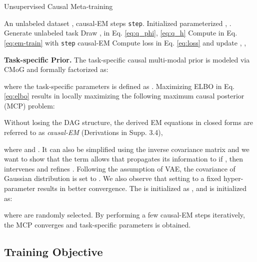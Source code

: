 \documentclass[letterpaper]{article} \usepackage{aaai23}  \usepackage{times}  \usepackage{helvet}  \usepackage{courier}  \usepackage[hyphens]{url}  \usepackage{graphicx} \urlstyle{rm} \def\UrlFont{\rm}  \usepackage{natbib}  \usepackage{caption} \frenchspacing  \setlength{\pdfpagewidth}{8.5in}  \setlength{\pdfpageheight}{11in}  \usepackage{algorithm}
\theoremstyle{plain}
\theoremstyle{definition}
\theoremstyle{remark}
\begin{document}
\begin{algorithm}[t]
	\small
	\caption{Unsupervised Causal Meta-training}
	\label{alg:meta-training}
	\begin{algorithmic}
		 An unlabeled dataset , causal-EM steps \texttt{step}.
		\STATE Initialized parameterized , .
		\STATE Generate unlabeled task 
		\STATE Draw ,  in Eq. \ref{eq:q_phi}, \ref{eq:q_h}
		\STATE Compute  in Eq. \ref{eq:em-train} with \texttt{step} causal-EM 
		\STATE Compute loss  in Eq. \ref{eq:loss} and update , , 				
		\ENDWHILE
	\end{algorithmic}
\end{algorithm}







\noindent\textbf{Task-specific Prior.} 
The task-specific causal multi-modal prior is modeled via CMoG and formally factorized as:
 		
where the task-specific parameters  is defined as . Maximizing ELBO in Eq. \ref{eq:elbo} results in locally maximizing the following maximum causal posterior (MCP) problem:
	
Without losing the DAG structure, the derived EM equations in closed forms are referred to as \textit{causal-EM} (Derivations in Supp. 3.4),

where  and . It can also be simplified using the inverse covariance matrix and we want to show that the term  allows that  propagates its information to  if , then intervenes and refines .  Following the assumption of VAE, the covariance of Gaussian distribution is set to . We also observe that setting  to a fixed hyper-parameter  results in better convergence. The  is initialized as , and  is initialized as:

where  are randomly selected. By performing a few causal-EM steps iteratively, the MCP converges and task-specific parameters  is obtained. 

\subsection{Training Objective}
\end{document}
